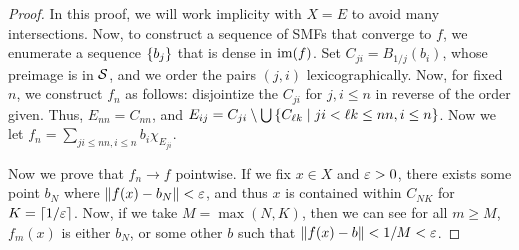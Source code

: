 \begin{proof}
    In this proof, we will work implicity with $X = E$ to avoid many intersections. Now, to construct a sequence of SMFs that converge to $f$, we enumerate a sequence $\qty{b_j}$ that is dense in $\operatorname{im}(f)$. Set $C_{ji} = B_{1/j}(b_i)$, whose preimage is in $\mathcal S$, and we order the pairs $(j, i)$ lexicographically. Now, for fixed $n$, we construct $f_n$ as follows: disjointize the $C_{ji}$ for $j, i \le n$ in reverse of the order given. Thus, $E_{nn} = C_{nn}$, and $E_{ij} = C_{ji} \setminus \bigcup \qty{ C_{\ell k} \mid ji < \ell k \le nn, i \le n}$. Now we let $f_n = \sum_{ji \le nn, i \le n} b_i \chi_{E_{ji}}$.

    Now we prove that $f_n \to f$ pointwise. If we fix $x \in X$ and $\varepsilon > 0$, there exists some point $b_N$ where $\norm{f(x) - b_N} < \varepsilon$, and thus $x$ is contained within $C_{NK}$ for $K = \lceil 1/\varepsilon \rceil$. Now, if we take $M = \max(N, K)$, then we can see for all $m \ge M$, $f_m(x)$ is either $b_N$, or some other $b$ such that $\norm{f(x) - b} < 1/M < \varepsilon$.
\end{proof}
